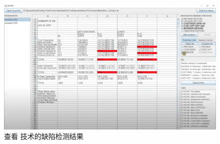 \begin{figure}[tp]    
    \centering
    \includegraphics[width=\textwidth]{figure/sg/sguard-5.png}
    \caption{查看 \wa 技术的缺陷检测结果}
    \label{figure-sg5}
\end{figure}